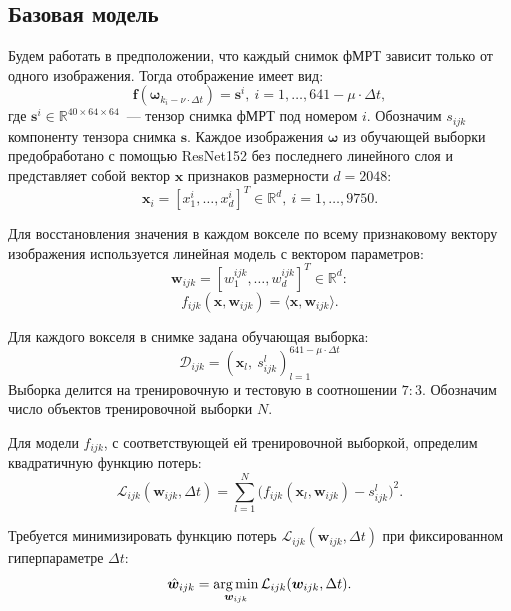\documentclass[12pt,twoside]{article}
\begin{document}
\subsection{Базовая модель}
Будем работать в предположении, что каждый снимок фМРТ зависит только от одного изображения.
Тогда отображение имеет вид:
\begin{equation}
	\label{basic_model}
	\bm{f}(\bm{\omega}_{k_i - \nu \cdot \Delta t}) = \bm{s}^i, \ i = 1, \ldots, 641-\mu \cdot \Delta t,
\end{equation}
где $\bm{s}^i \in \mathbb{R}^{40 \times 64 \times 64}$~--- тензор снимка фМРТ под номером $i$.
Обозначим $s_{ijk}$ компоненту тензора снимка $\bm{s}$.
Каждое изображения $\bm{\omega}$ из обучающей выборки предобработано с помощью ResNet152 без последнего линейного слоя и представляет собой вектор $\bm{x}$ признаков размерности $d=2048$:
\[ \bm{x}_i = [x^i_1, \ldots, x^i_{d}]^{T} \in \mathbb{R}^{d}, \ i = 1, \ldots, 9750. \]
	
Для восстановления значения в каждом вокселе по всему признаковому вектору изображения используется линейная модель с вектором параметров:
\[ \bm{w}_{ijk} = [w^{ijk}_1, \ldots, w^{ijk}_{d}]^{T} \in \mathbb{R}^{d}: \]
\begin{equation}
	\label{f_ijk}
	f_{ijk}(\bm{x}, \bm{w}_{ijk}) = \langle \bm{x}, \bm{w}_{ijk} \rangle.
\end{equation}

Для каждого вокселя в снимке задана обучающая выборка:
\begin{equation}
    \mathcal{D}_{ijk} = \left(\bm{x}_l,~s^{l}_{ijk} \right)^{641 - \mu \cdot \Delta t}_{l = 1}
\end{equation}
Выборка делится на тренировочную и тестовую в соотношении $7 : 3$. 
Обозначим число объектов тренировочной выборки $N$.

Для модели $f_{ijk}$, с соответствующей ей тренировочной выборкой,
определим квадратичную функцию потерь:
\begin{equation}
	\label{Loss}
	\mathcal{L}_{ijk}(\bm{w}_{ijk}, \Delta t) = \sum\limits_{l = 1}^{N} \big(f_{ijk}(\bm{x}_l, \bm{w}_{ijk}) - s^{l}_{ijk}\big)^2.
\end{equation}

Требуется минимизировать функцию потерь $\mathcal{L}_{ijk}(\bm{w}_{ijk}, \Delta t)$ при фиксированном гиперпараметре $\Delta t$:
\begin{equation}
	\label{basic_Problem}
	\hat{\bm{w}}_{ijk} = \argmin_{\bm{w}_{ijk}} \mathcal{L}_{ijk}(\bm{w}_{ijk}, \Delta t).
\end{equation} 
\end{document}
